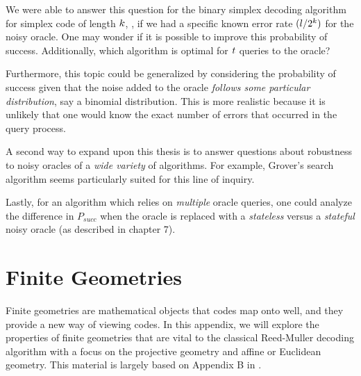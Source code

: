 \documentclass[12pt,twoside]{reedthesis}
\theoremstyle{definition}
\begin{document}
We were able to answer this question for the binary simplex decoding algorithm for simplex code of length $k$, \simpl{\mlen}, if we had a specific known error rate $(l/2^k )$ for the noisy oracle. One may wonder if it is possible to improve this probability of success. Additionally, which algorithm is optimal for $t$ queries to the oracle?

Furthermore, this topic could be generalized by considering the probability of success given that the noise added to the oracle \emph{follows some particular distribution}, say a binomial distribution. This is more realistic because it is unlikely that one would know the exact number of errors that occurred in the query process.

A second way to expand upon this thesis is to answer questions about robustness to noisy oracles of a \emph{wide variety} of algorithms. For example, Grover's search algorithm \citep{grover1996fast} seems particularly suited for this line of inquiry. 

Lastly, for an algorithm which relies on \emph{multiple} oracle queries, one could analyze the difference in $P_{succ}$ when the oracle is replaced with a \emph{stateless} versus a \emph{stateful} noisy oracle (as described in chapter 7).




    \appendix

	
\chapter{Finite Geometries} \label{finite_geom_chapter}
Finite geometries are mathematical objects that codes map onto well, and they provide a new way of viewing codes. In this appendix, we will explore the properties of finite geometries that are vital to the classical Reed-Muller decoding algorithm with a focus on the projective geometry and affine or Euclidean geometry. This material is largely based on Appendix B in \citep{macwilliamssloane}.
\end{document}
